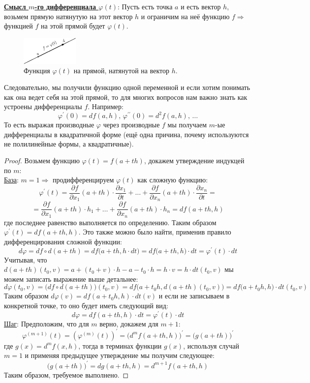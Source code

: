 \documentclass[12pt]{article}
\theoremstyle{definition}
\begin{document}
\textbf{\uline{Смысл $m$-го дифференциала $\varphi(t)$}}: Пусть есть точка $a$ и есть вектор $h$, возьмем прямую натянутую на этот вектор $h$ и ограничим на неё функцию $f \Rightarrow$ функцией $f$ на этой прямой будет $\varphi(t)$.
\begin{figure}[H]
	\centering
	\includegraphics[width=0.25\textwidth]{18_1.eps}
	\caption{Функция $\varphi(t)$ на прямой, натянутой на вектор $h$.}
	\label{18_1}
\end{figure}
Следовательно, мы получили функцию одной переменной и если хотим понимать как она ведет себя на этой прямой, то для многих вопросов нам важно знать как устроены дифференциалы $f$. Например: 
$$
	\varphi^\prime(0) = df(a,h), \, \varphi^{\prime\prime}(0) = d^2f(a,h), \, \dotsc
$$
То есть выражая производные $\varphi$ через производные $f$ мы получаем $m$-ые дифференциалы в квадратичной форме (ещё одна причина, почему используются не полилинейные формы, а квадратичные).
\begin{proof}
	Возьмем функцию $\varphi(t) = f(a + th)$, докажем утверждение индукцей по $m$:\\
	\uline{База}: $m = 1 \Rightarrow$ продифференцируем $\varphi(t)$ как сложную функцию:
	$$
		\varphi^\prime(t) = \dfrac{\partial f}{\partial x_1}(a + th){\cdot}\dfrac{\partial x_1}{\partial t} + \dotsc + \dfrac{\partial f}{\partial x_n}(a + th){\cdot}\dfrac{\partial x_n}{\partial t} =
	$$
	$$	
	 	= \dfrac{\partial f}{\partial x_1}(a + th){\cdot}h_1 + \dotsc + \dfrac{\partial f}{\partial x_n}(a + th){\cdot}h_n = df(a + th, h)
	$$
	где последнее равенство выполняется по определению. Таким образом $\varphi^\prime(t) = df(a + th,h)$. Это также можно было найти, применив правило дифференцирования сложной функции:
	$$
		d\varphi =df \circ d(a + th) = df\big(a + th, h{\cdot}dt \big) = df\big(a + th, h \big) {\cdot}dt = \varphi^\prime(t){\cdot}dt
	$$	
	Учитывая, что $d(a+th)(t_0,v) = a + (t_0 + v){\cdot}h - a - t_0{\cdot}h = h{\cdot}v = h{\cdot}dt(t_0,v)$ мы можем записать выражение выше детальнее:
	$$
		d\varphi(t_0,v) = \big(df \circ d(a + th)\big)(t_0,v) = df\big(a + t_0h, d(a+th)(t_0,v) \big) = df\big(a + t_0h, h \big){\cdot}dt(t_0,v)
	$$
	Таким образом $d\varphi(v) = df(a + t_0h,h){\cdot}dt(v)$ и если не записываем в конкретной точке, то оно будет иметь следующий вид: 
	$$
		d\varphi = df(a + th,h){\cdot}dt = \varphi^\prime(t){\cdot}dt
	$$
	\uline{Шаг}: Предположим, что для $m$ верно, докажем для $m+1$:
	$$
		\varphi^{(m+1)}(t) = (\varphi^{(m)}(t))^\prime = \big(d^mf(a + th, h)\big)^\prime = \big(g(a +th)\big)^\prime
	$$
	где $g(x) = d^mf(x,h)$, тогда в терминах функции $g(x)$, используя случай $m=1$ и применяя предыдущее утверждение мы получим следующее:
	$$
		\big(g(a +th)\big)^\prime = dg(a + th, h) = d^{m+1}f(a + th,h)
	$$
	Таким образом, требуемое выполнено.
\end{proof}
\end{document}
